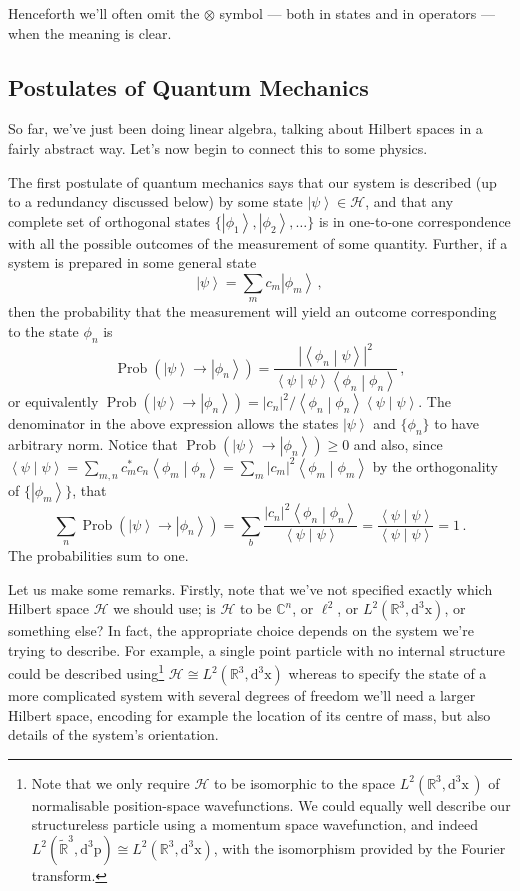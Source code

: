 \documentclass{article}
\theoremstyle{plain}\theoremheaderfont{\normalfont\itshape}\theorembodyfont{\rmfamily}\theoremseparator{.}\newtheorem*{rem}{Remark}\newtheorem*{ex}{Example}\newtheorem*{proof}{Proof}\newtheorem*{altp}{Alternative proof}
\theoremstyle{plain}\theoremheaderfont{\normalfont\bfseries}\theorembodyfont{\rmfamily}\theoremseparator{.}\newtheorem{thm}{Theorem}[section]\newtheorem{lem}[thm]{Lemma}\newtheorem{prop}[thm]{Proposition}\newtheorem*{cor}{Corollary}\newtheorem{defn}[thm]{Definition}\newtheorem{clm}[thm]{Claim}\newtheorem{clminproof}{Claim}
\theoremstyle{break}\theoremheaderfont{\normalfont\itshape}\theorembodyfont{\rmfamily}\theoremseparator{.\medskip}\newtheorem*{proofskip}{Proof}\newtheorem*{exs}{Examples}\newtheorem*{rems}{Remarks}
\theoremstyle{break}\theoremheaderfont{\normalfont\bfseries}\theorembodyfont{\rmfamily}\theoremseparator{.\medskip}\newtheorem{lemskip}[thm]{Lemma}\newtheorem{defnskip}[thm]{Definition}\newtheorem{propskip}[thm]{Proposition}\newtheorem{thmskip}[thm]{Theorem}
\numberwithin{equation}{section}
\newcommand{\dd}[2][]{\mathrm{d}^{#1} #2\,}
\renewcommand{\d}[2][]{\mathrm{d}^{#1} #2}
\newcommand{\ket}[1]{\left| #1 \right\rangle}
\newcommand{\braket}[2]{\left\langle #1 \middle| #2 \right\rangle}
\newcommand{\vb}[1]{\bm{\mathrm{#1}}}
\newcommand{\abs}[1]{\left| #1 \right|}
\newcommand{\hb}{\mathcal{H}}
\DeclareMathOperator{\Prob}{Prob}
\newcommand{\RR}{\mathbb{R}}
\newcommand{\CC}{\mathbb{C}}
\begin{document}
    Henceforth we'll often omit the \(\otimes\) symbol --- both in states and in operators --- when the meaning is clear.
    \subsection{Postulates of Quantum Mechanics}
    So far, we've just been doing linear algebra, talking about Hilbert spaces in a fairly abstract way. Let's now begin to connect this to some physics.

    The first postulate of quantum mechanics says that our system is described (up to a redundancy discussed below) by some state \(\ket{\psi}\in\hb\), and that any complete set of orthogonal states \(\{\ket{\phi_1},\ket{\phi_2},\dots\}\) is in one-to-one correspondence with all the possible outcomes of the measurement of some quantity. Further, if a system is prepared in some general state
    \begin{equation}
        \ket{\psi}=\sum_{m}c_m\ket{\phi_m}\,,
    \end{equation}
    then the probability that the measurement will yield an outcome corresponding to the state \(\phi_n\) is
    \begin{equation}\label{Born_rule}
        \Prob(\ket{\psi}\to\ket{\phi_n})=\frac{\abs{\braket{\phi_n}{\psi}}^2}{\braket{\psi}{\psi}\braket{\phi_n}{\phi_n}}\,,
    \end{equation}
    or equivalently \(\Prob(\ket{\psi}\to\ket{\phi_n})=\abs{c_n}^2/\braket{\phi_n}{\phi_n}\braket{\psi}{\psi}\). The denominator in the above expression allows the states \(\ket{\psi}\) and \(\{\phi_n\}\) to have arbitrary norm. Notice that \(\Prob(\ket{\psi}\to\ket{\phi_n})\ge 0\) and also, since \(\braket{\psi}{\psi}=\sum_{m,n}c_m^*c_n\braket{\phi_m}{\phi_n}=\sum_m\abs{c_m}^2\braket{\phi_m}{\phi_m}\) by the orthogonality of \(\{\ket{\phi_m}\}\), that
    \begin{equation}
        \sum_n\Prob(\ket{\psi}\to\ket{\phi_n})=\sum_b\frac{\abs{c_n}^2\braket{\phi_n}{\phi_n}}{\braket{\psi}{\psi}}=\frac{\braket{\psi}{\psi}}{\braket{\psi}{\psi}}=1\,.
    \end{equation}
    The probabilities sum to one.

    Let us make some remarks. Firstly, note that we've not specified exactly which Hilbert space \(\hb\) we should use; is \(\hb\) to be \(\CC^n\), or \(\ell^2\), or \(L^2(\RR^3,\d[3]{\vb{x}})\), or something else? In fact, the appropriate choice depends on the system we're trying to describe. For example, a single point particle with no internal structure could be described using\footnote{Note that we only require \(\hb\) to be isomorphic to the space \(L^2(\RR^3,\dd[3]{\vb{x}})\) of normalisable position-space wavefunctions. We could equally well describe our structureless particle using a momentum space wavefunction, and indeed \(L^2(\tilde{\RR}^3,\d[3]{\vb{p}})\cong L^2(\RR^3,\d[3]{\vb{x}})\), with the isomorphism provided by the Fourier transform.} \(\hb\cong L^2(\RR^3,\d[3]{\vb{x}})\) whereas to specify the state of a more complicated system with several degrees of freedom we'll need a larger Hilbert space, encoding for example the location of its centre of mass, but also details of the system's orientation.
\end{document}
